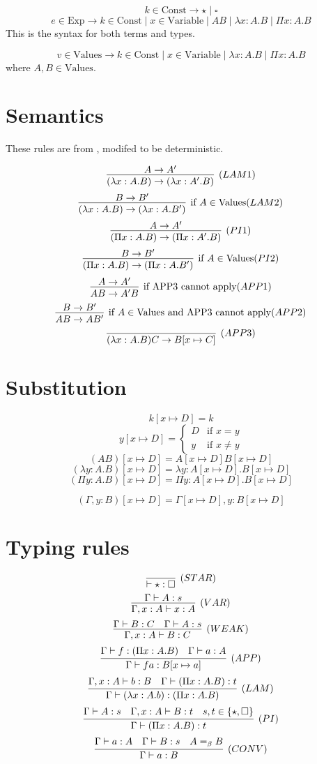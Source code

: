 \documentclass{article}
\begin{document}
\[k\in \text{Const} \rightarrow \star \mid \square\]
\[e\in \text{Exp}\rightarrow k\in \text{Const} \mid x\in \text{Variable} \mid A B \mid \lambda x:A.B \mid \Pi x:A.B\]
This is the syntax for both terms and types.

\[v\in \text{Values}\rightarrow k\in \text{Const} \mid x\in \text{Variable} \mid \lambda x:A.B \mid \Pi x: A. B\]
where $A,B\in\text{Values}$.
\section{Semantics}

These rules are from \cite{Casinghino10}, modifed to be deterministic.

\[\infer[(LAM1)]{(\lambda x:A.B)\rightarrow (\lambda x:A'.B)}{A\rightarrow A'}\]
\[\infer[\text{if $A\in\text{Values}$}(LAM2)]{(\lambda x:A.B)\rightarrow (\lambda x:A.B')}{B\rightarrow B'}\]
\[\infer[(PI1)]{(\Pi x:A.B)\rightarrow (\Pi x:A'.B)}{A\rightarrow A'}\]
\[\infer[\text{if $A\in\text{Values}$}(PI2)]{(\Pi x:A.B)\rightarrow (\Pi x:A.B')}{B\rightarrow B'}\]
\[\infer[\text{if APP3 cannot apply}(APP1)]{A B\rightarrow A' B}{A\rightarrow A'}\]
\[\infer[\text{if $A\in \text{Values}$ and APP3 cannot apply}(APP2)]{A B\rightarrow A B'}{B\rightarrow B'}\]
\[\infer[(APP3)]{(\lambda x:A.B) C\rightarrow B[x\mapsto C]}{}\]

\section{Substitution}

\[k[x\mapsto D]=k\]
\[
y[x\mapsto D]=
\begin{cases}
  D & \text{if $x=y$}\\
  y & \text{if $x\ne y$}
\end{cases}
\]
\[(A B)[x\mapsto D]=A[x\mapsto D] B[x\mapsto D]\]
\[(\lambda y:A.B)[x\mapsto D]=\lambda y:A[x\mapsto D].B[x\mapsto D]\]
\[(\Pi y:A.B)[x\mapsto D]=\Pi y:A[x\mapsto D].B[x\mapsto D]\]

\[(\Gamma,y:B)[x\mapsto D]=\Gamma[x\mapsto D],y:B[x\mapsto D]\]

\section{Typing rules}

\[\infer[(STAR)]{\vdash\star:\square}{}\]
\[\infer[(VAR)]{\Gamma,x:A\vdash x:A}{\Gamma\vdash A:s}\]
\[\infer[(WEAK)]{\Gamma,x:A\vdash B:C}{\Gamma\vdash B:C & \Gamma\vdash A:s}\]
\[\infer[(APP)]{\Gamma\vdash f a:B[x\mapsto a]}{\Gamma\vdash f:(\Pi x:A.B) & \Gamma\vdash a:A}\]
\[\infer[(LAM)]{\Gamma\vdash(\lambda x:A.b):(\Pi x:A.B)}{\Gamma,x:A\vdash b:B & \Gamma\vdash(\Pi x:A.B):t}\]
\[\infer[(PI)]{\Gamma\vdash(\Pi x:A.B):t}{\Gamma\vdash A:s & \Gamma,x:A\vdash B:t & s,t\in\{\star,\square\}}\]
\[\infer[(CONV)]{\Gamma\vdash a:B}{\Gamma\vdash a:A & \Gamma\vdash B:s & A=_\beta B}\]
\end{document}
